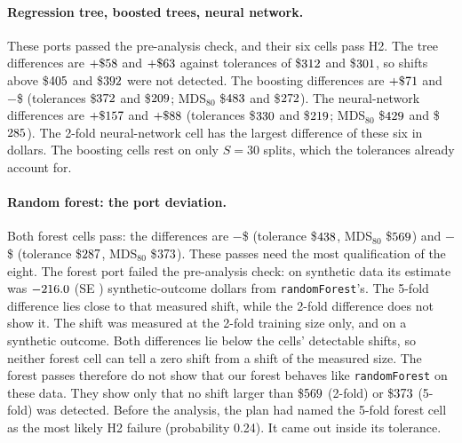\documentclass[11pt]{article}
\def\absvalaux-#1\relax{#1}
\newcommand{\absval}[1]{\expandafter\absvalaux#1\relax}
\newcommand{\negusd}[1]{$-$\$\absval{#1}}
\newcommand{\var}[1]{\texttt{#1}}
\begin{document}
\paragraph{Regression tree, boosted trees, neural network.} These ports passed the
pre-analysis check, and their six cells pass H2. The tree differences are $+\$58$
and $+\$63$ against tolerances of \$$312$ and \$$301$, so
shifts above \$$405$ and \$$392$ were not detected. The boosting
differences are $+\$71$ and \negusd{\DiffBoostingFive}
(tolerances \$$372$ and \$$209$; MDS$_{80}$ \$$483$ and
\$$272$). The neural-network differences are $+\$157$ and
$+\$88$ (tolerances \$$330$ and \$$219$; MDS$_{80}$
\$$429$ and \$$285$). The 2-fold neural-network cell has the largest
difference of these six in dollars. The boosting cells rest on
only $S = 30$ splits, which the tolerances already account for.

\paragraph{Random forest: the port deviation.} Both forest cells pass: the differences are
\negusd{\DiffForestTwo} (tolerance \$$438$, MDS$_{80}$ \$$569$) and
\negusd{\DiffForestFive} (tolerance \$$287$, MDS$_{80}$ \$$373$).
These passes need the most qualification of the eight. The forest port failed the
pre-analysis check: on synthetic data its estimate was $-216.0$ (SE
\PortShiftSeForest) synthetic-outcome dollars from \var{randomForest}'s. The 5-fold
difference lies close to that measured shift, while the 2-fold difference does not show
it. The shift was measured at the 2-fold training size only, and on a synthetic outcome.
Both differences lie below the cells' detectable shifts, so neither forest cell can tell a
zero shift from a shift of the measured size. The forest passes therefore do not show
that our forest behaves like \var{randomForest} on these data. They show only that no
shift larger than \$$569$ (2-fold) or \$$373$ (5-fold) was detected.
Before the analysis, the plan had named the 5-fold forest cell as the most likely H2
failure (probability 0.24). It came out inside its tolerance.
\end{document}
